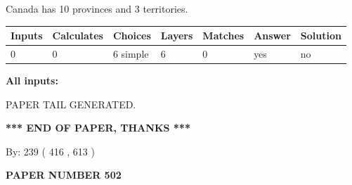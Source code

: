 \documentclass[12pt]{article}
\begin{document}
 
\noindent{}
 
 
Canada has 10  provinces and 3 territories.
 
 
\noindent{}
 
 
   
   
   
   
\noindent\begin{tabular}{|l|l|l|l|l|l|l|}
 \hline
Inputs & Calculates & Choices & Layers & Matches & Answer & Solution \\ \hline
 0  & 
 0  & 
 6
  simple  
  & 
 6  & 
 0  & 
  yes & 
  no 
  \\ \hline
 \end{tabular}
   
   
   
   
\noindent{}
   
   
   
   
\noindent\vspace{0.1in}\hspace{-0.08in} {\textbf{\Large{All inputs: }}}
   
   
   
   
   
   
 \vspace{0.2in}
 
   
   
\vspace{2.0in} PAPER TAIL GENERATED.
   
   
   
   
\vspace{1.0in} 
{\textbf{\large{ *** END OF PAPER, THANKS *** }}} 
   
   
\hspace{1.0in} By: 
 239 ( 416 ,  613 )
   
   
   
   
\newpage 
\setcounter{page}{ 
   502001 } 
   
   
   
   
 {\textbf{ \Large{ PAPER NUMBER  502  }}}
   
   
\vspace{0.2in}
   
   
   
\end{document}
